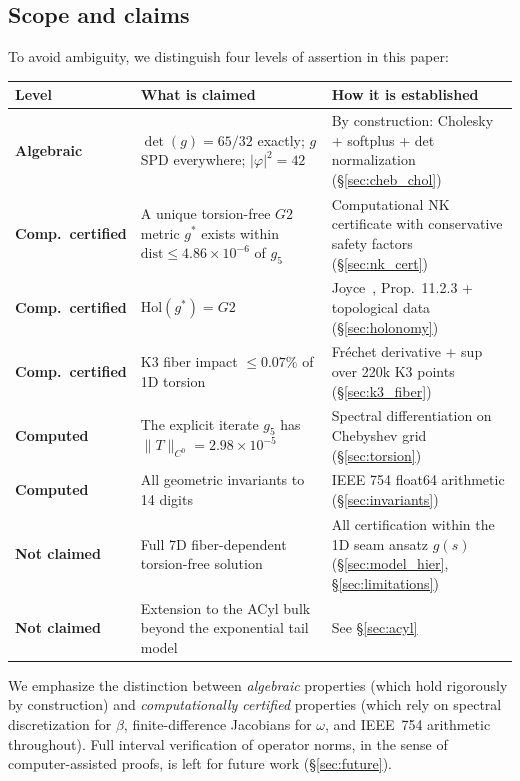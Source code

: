 \documentclass[11pt,a4paper]{article}
\newcommand{\Gtwo}{\mathrm{G}_2}
\newcommand{\Hol}{\mathrm{Hol}}
\newcommand{\dist}{\mathrm{dist}}
\newcommand{\norm}[1]{\|#1\|}
\theoremstyle{remark}
\def\Gtwo{G2}%
\begin{document}
\subsection{Scope and claims}\label{sec:scope}

To avoid ambiguity, we distinguish four levels of assertion in this paper:

\begin{table}[H]
\centering
\small
\begin{tabular}{p{3.2cm}p{5.5cm}p{7cm}}
\toprule
\textbf{Level} & \textbf{What is claimed} & \textbf{How it is established} \\
\midrule
\textbf{Algebraic} & $\det(g) = 65/32$ exactly; $g$ SPD everywhere; $|\varphi|^2 = 42$ & By construction: Cholesky + softplus + det normalization (\S\ref{sec:cheb_chol}) \\[0.5em]
\textbf{Comp.\ certified} & A unique torsion-free $\Gtwo$ metric $g^*$ exists within $\dist \leq 4.86 \times 10^{-6}$ of $g_5$ & Computational NK certificate with conservative safety factors (\S\ref{sec:nk_cert}) \\[0.5em]
\textbf{Comp.\ certified} & $\Hol(g^*) = \Gtwo$ & Joyce~\cite{joyce2000}, Prop.~11.2.3 + topological data (\S\ref{sec:holonomy}) \\[0.5em]
\textbf{Comp.\ certified} & K3 fiber impact $\leq 0.07\%$ of 1D torsion & Fr\'echet derivative + sup over 220k K3 points (\S\ref{sec:k3_fiber}) \\[0.5em]
\textbf{Computed} & The explicit iterate $g_5$ has $\norm{T}_{C^0} = 2.98 \times 10^{-5}$ & Spectral differentiation on Chebyshev grid (\S\ref{sec:torsion}) \\[0.5em]
\textbf{Computed} & All geometric invariants to 14 digits & IEEE 754 float64 arithmetic (\S\ref{sec:invariants}) \\[0.5em]
\textbf{Not claimed} & Full 7D fiber-dependent torsion-free solution & All certification within the 1D seam ansatz $g(s)$ (\S\ref{sec:model_hier}, \S\ref{sec:limitations}) \\[0.5em]
\textbf{Not claimed} & Extension to the ACyl bulk beyond the exponential tail model & See \S\ref{sec:acyl} \\
\bottomrule
\end{tabular}
\end{table}

We emphasize the distinction between \textit{algebraic} properties (which hold rigorously by
construction) and \textit{computationally certified} properties (which rely on spectral
discretization for $\beta$, finite-difference Jacobians for $\omega$, and IEEE~754 arithmetic
throughout). Full interval verification of operator norms, in the sense of
computer-assisted proofs, is left for future work (\S\ref{sec:future}).
\end{document}
